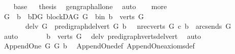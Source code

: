 \begin{isabellebody}
\ \ \isamarkupfalse%
\ base\isanewline
{}\isamarkupfalse%
\ \isamarkupfalse%
\ {\isacharquery}{\kern0pt}thesis\ \isamarkupfalse%
\ gen{\isacharunderscore}{\kern0pt}graph{\isacharunderscore}{\kern0pt}all{\isacharunderscore}{\kern0pt}one\ \isamarkupfalse%
\ auto\isanewline
{}\isamarkupfalse%
\isanewline
\ \ \isamarkupfalse%
\ more\isanewline
\ \ \isamarkupfalse%
\ \isamarkupfalse%
\ G{}\ \ b\ \ bD{\isacharunderscore}{\kern0pt}G{}{\isacharcolon}{\kern0pt}\ {\isachardoublequoteopen}blockDAG\ G{}{\isachardoublequoteclose}\ \ b{\isacharunderscore}{\kern0pt}in{\isacharcolon}{\kern0pt}\ {\isachardoublequoteopen}b\ {\isasymin}\ verts\ G{\isachardoublequoteclose}\isanewline
\ \ \ \ \ \ \ del{\isacharunderscore}{\kern0pt}v{\isacharcolon}{\kern0pt}\ {\isachardoublequoteopen}G{}\ {\isacharequal}{\kern0pt}\ pre{\isacharunderscore}{\kern0pt}digraph{\isachardot}{\kern0pt}del{\isacharunderscore}{\kern0pt}vert\ G\ b\ {\isachardoublequoteclose}\ \ nre{\isacharcolon}{\kern0pt}{\isachardoublequoteopen}{\isacharparenleft}{\kern0pt}{\isasymforall}c{\isasymin}verts\ G{\isachardot}{\kern0pt}\ {\isacharparenleft}{\kern0pt}c{\isacharcomma}{\kern0pt}\ b{\isacharparenright}{\kern0pt}\ {\isasymnotin}\ {\isacharparenleft}{\kern0pt}arcs{\isacharunderscore}{\kern0pt}ends\ G{\isacharparenright}{\kern0pt}\isactrlsup {\isacharplus}{\kern0pt}{\isacharparenright}{\kern0pt}{\isachardoublequoteclose}\isanewline
\ \ \ \ \ \ \isamarkupfalse%
\ auto\isanewline
\ \ \ \ \isamarkupfalse%
\ \isamarkupfalse%
\ {\isachardoublequoteopen}b\ {\isasymnotin}\ verts\ G{}{\isachardoublequoteclose}\ \isamarkupfalse%
\ del{\isacharunderscore}{\kern0pt}v\ pre{\isacharunderscore}{\kern0pt}digraph{\isachardot}{\kern0pt}verts{\isacharunderscore}{\kern0pt}del{\isacharunderscore}{\kern0pt}vert\ \isamarkupfalse%
\ auto\isanewline
\ \ \ \ \isamarkupfalse%
\ \isamarkupfalse%
\ {\isachardoublequoteopen}Append{\isacharunderscore}{\kern0pt}One\ G{}\ G\ b{\isachardoublequoteclose}\ \isamarkupfalse%
\ Append{\isacharunderscore}{\kern0pt}One{\isacharunderscore}{\kern0pt}def\ Append{\isacharunderscore}{\kern0pt}One{\isacharunderscore}{\kern0pt}axioms{\isacharunderscore}{\kern0pt}def\ \isanewline

\end{isabellebody}
